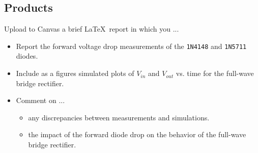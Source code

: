 \documentclass[11pt]{article}
\begin{document}
\subsection*{Products}

Upload to Canvas a brief \LaTeX\ report in which you ...
\begin{itemize}
\item Report the forward voltage drop measurements of the
  \texttt{1N4148} and \texttt{1N5711} diodes.

\item Include as a figures simulated plots of $V_{in}$
  and $V_{out}$ vs. time for the full-wave bridge rectifier.

\item Comment on ...
  \begin{itemize}
    \item any discrepancies between measurements and
      simulations.

  \item the impact of the forward diode drop on the behavior
    of the full-wave bridge rectifier.
  \end{itemize}

\end{itemize}
\end{document}
